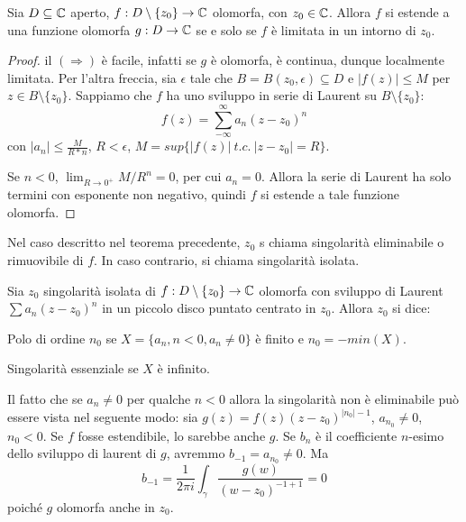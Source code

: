 \begin{thm}
    Sia $D\subseteq\mathbb{C}$ aperto, $f:D\setminus\{z_0\}\rightarrow\mathbb{C}$ olomorfa, con
    $z_0\in\mathbb{C}$. Allora $f$ si estende a una funzione olomorfa $g:D\rightarrow\mathbb{C}$
    se e solo se $f$ \`e limitata in un intorno di $z_0$.
\end{thm}
\begin{proof}
    il $(\Rightarrow)$ \`e facile, infatti se $g$ \`e olomorfa, \`e continua,
    dunque localmente limitata. Per l'altra freccia, sia $\epsilon$ tale che
    $B = B(z_0,\epsilon)\subseteq D$ e $|f(z)|\leq M$ per $z\in B\setminus
    \{z_0\}$. Sappiamo che $f$ ha uno sviluppo in serie di Laurent su
    $B\setminus \{z_0\}$:
    \[
        f(z) = \sum_{-\infty}^\infty a_n (z-z_0)^n
    \]
    con $|a_n|\leq\frac{M}{R*n}$, $R<\epsilon$, $M=sup\{|f(z)|\ t.c.\
    |z-z_0|=R\}$.

    Se $n<0$, $\lim_{R\rightarrow 0^+} M/R^n = 0$, per cui $a_n = 0$. Allora la
    serie di Laurent ha solo termini con esponente non negativo, quindi $f$ si
    estende a tale funzione olomorfa.
\end{proof}

\begin{defn}
    Nel caso descritto nel teorema precedente, $z_0$ s chiama singolarit\`a
    eliminabile o rimuovibile di $f$. In caso contrario, si chiama singolarit\`a
    isolata.
\end{defn}

\begin{defn}
    Sia $z_0$ singolarit\`a isolata di $f:D\setminus\{z_0\}\rightarrow\mathbb{C}$
    olomorfa con sviluppo di Laurent $\sum a_n (z-z_0)^n$ in un piccolo disco
    puntato centrato in $z_0$. Allora $z_0$ si dice:
    \begin{nlist}
        \item
            Polo di ordine $n_0$ se $X=\{a_n, n<0, a_n\neq 0\}$ \`e finito e
            $n_0 = -min(X)$.
        \item
            Singolarit\`a essenziale se $X$ \`e infinito.
    \end{nlist}
\end{defn}

\begin{oss}
    Il fatto che se $a_n\neq 0 $ per qualche $n<0$ allora la singolarit\`a non
    \`e eliminabile pu\`o essere vista nel seguente modo: sia $g(z) =
    f(z)(z-z_0)^{|n_0|-1}$, $a_{n_0}\neq 0$, $n_0<0$. Se $f$ fosse estendibile,
    lo sarebbe anche $g$. Se $b_n$ \`e il coefficiente $n$-esimo dello sviluppo
    di laurent di $g$, avremmo $b_{-1} = a_{n_0} \neq 0$.
    Ma
    \[
        b_{-1} = \frac{1}{2\pi i} \int_\gamma \frac{g(w)}{(w-z_0)^{-1+1}} = 0
    \]
    poich\'e $g$ olomorfa anche in $z_0$.
\end{oss}

